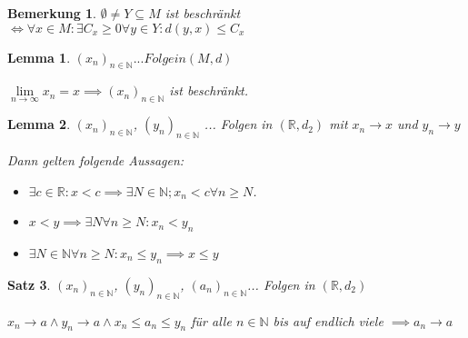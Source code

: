 \documentclass[twocolumn]{article}
\newtheorem{theorem}{Satz}[section]
\newtheorem{lemma}[theorem]{Lemma}
\newtheorem*{remark}{Bemerkung}
\newcommand*{\logeq}{\Leftrightarrow}
\begin{document}
\begin{remark}
	$\emptyset \neq Y \subseteq M$ ist beschränkt $\logeq \forall x \in M : \exists C_x \geq 0 \forall y \in Y: d(y,x)\leq C_x$
\end{remark}

\begin{lemma}
	$(x_n)_{n \in \mathbb{N}}... Folge in (M,d)$
	
	$\lim\limits_{n\rightarrow\infty}x_n =x \implies (x_n)_{n \in \mathbb{N}}$ ist beschränkt.
\end{lemma}

\begin{lemma}
	$(x_n)_{n \in \mathbb{N}}$, $(y_n)_{n \in \mathbb{N}}$ ... Folgen in $(\mathbb{R},d_2)$ mit $x_n\rightarrow x$ und $y_n\rightarrow y$
	
	Dann gelten folgende Aussagen:
	\begin{itemize}
		\item $\exists c \in \mathbb{R} : x < c \implies \exists N \in \mathbb{N}; x_n < c \forall n \geq N$.
		\item $x<y\implies \exists N \forall n \geq N : x_n < y_n$
		\item $\exists N \in \mathbb{N} \forall n \geq N: x_n \leq y_n \implies x \leq y$
	\end{itemize}
\end{lemma}

\begin{theorem}
	$(x_n)_{n \in \mathbb{N}}$, $(y_n)_{n \in \mathbb{N}}$, $(a_n)_{n \in \mathbb{N}}$... Folgen in $(\mathbb{R},d_2)$
	
	$x_n\rightarrow a \land y_n \rightarrow a \land x_n \leq a_n \leq y_n$ für alle $n \in \mathbb{N}$ bis auf endlich viele $\implies a_n \rightarrow a$
\end{theorem}
\end{document}
